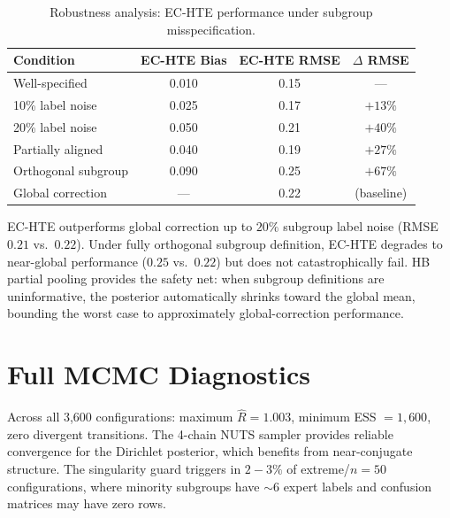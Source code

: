 \documentclass[11pt,twocolumn]{article}
\theoremstyle{remark}
\begin{document}
\begin{table}[h]
\centering
\caption{Robustness analysis: EC-HTE performance under subgroup misspecification.}
\label{tab:robustness}
\begin{tabular}{lccc}
\toprule
Condition & EC-HTE Bias & EC-HTE RMSE & $\Delta$ RMSE \\
\midrule
Well-specified & 0.010 & 0.15 & --- \\
10\% label noise & 0.025 & 0.17 & $+13\%$ \\
20\% label noise & 0.050 & 0.21 & $+40\%$ \\
Partially aligned & 0.040 & 0.19 & $+27\%$ \\
Orthogonal subgroup & 0.090 & 0.25 & $+67\%$ \\
\midrule
Global correction & --- & 0.22 & (baseline) \\
\bottomrule
\end{tabular}
\end{table}

EC-HTE outperforms global correction up to $20\%$ subgroup label noise (RMSE $0.21$ vs.\ $0.22$).
Under fully orthogonal subgroup definition, EC-HTE degrades to near-global performance ($0.25$ vs.\ $0.22$) but does not catastrophically fail.
HB partial pooling provides the safety net: when subgroup definitions are uninformative, the posterior automatically shrinks toward the global mean, bounding the worst case to approximately global-correction performance.

\section{Full MCMC Diagnostics}\label{app:mcmc}

Across all 3{,}600 configurations: maximum $\hat{R} = 1.003$, minimum ESS $= 1{,}600$, zero divergent transitions.
The 4-chain NUTS sampler provides reliable convergence for the Dirichlet posterior, which benefits from near-conjugate structure.
The singularity guard triggers in $2{-}3\%$ of extreme/$n{=}50$ configurations, where minority subgroups have ${\sim}6$ expert labels and confusion matrices may have zero rows.
\end{document}
